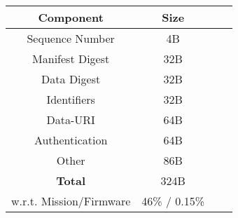 \documentclass{standalone}
\begin{document}
\begin{tabular}{cccc}
    \hline
    \textbf{Component}          & Size \\ \hline
            Sequence Number     & 4B      \\
            Manifest Digest           & 32B        \\
            Data Digest               & 32B          \\
            Identifiers       & 32B          \\
            Data-URI           & 64B       \\
            Authentication     & 64B        \\
            Other     & 86B       \\ \hline
    \textbf{Total}          & 324B        \\ \hline
    w.r.t. Mission/Firmware  & 46\% / 0.15\%    

\end{tabular}%
\end{document}
